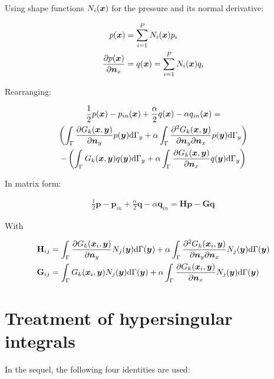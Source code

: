 \documentclass[a4paper, 10pt]{article}
\newcommand{\td}{\mathrm{d}}
\newcommand{\sx}{\bm{\mathnormal{x}}}
\newcommand{\sy}{\bm{\mathnormal{y}}}
\newcommand{\sn}{\bm{\mathnormal{n}}}
\newcommand{\bp}{\mathbf{p}}
\newcommand{\bq}{\mathbf{q}}
\newcommand{\bH}{\mathbf{H}}
\newcommand{\bG}{\mathbf{G}}
\begin{document}
Using shape functions $N_i(\sx)$ for the pressure and its normal derivative:

\begin{align}
	p(\sx) & = \sum\limits_{i=1}^P N_i(\sx)p_i \\
	\frac{\partial p(\sx)}{\partial \sn_x} & = q(\sx) = \sum\limits_{i=1}^P N_i(\sx)q_i
\end{align}

Rearranging:

\begin{multline}
	\frac{1}{2} p (\sx)
	-
	p_{in}(\sx)
	+
	\frac{\alpha}{2} q(\sx)
	-
	\alpha q_{in}(\sx)
	= \\
	\left(
	\int_{\Gamma} \frac{\partial{G}_k (\sx, \sy)}{\partial \sn_y} p(\sy) \td \Gamma_y
	+
	\alpha \int_{\Gamma}
	\frac{\partial^2{G}_k (\sx, \sy)}{\partial \sn_y \partial \sn_x} p(\sy) \td \Gamma_y
	\right)
	\\
	-
	\left(
	\int_{\Gamma} G_k(\sx,\sy) q(\sy) \td \Gamma_y
	+
	\alpha \int_{\Gamma}
	\frac{\partial G_k(\sx,\sy)}{\partial \sn_x}q(\sy) \td \Gamma_y
	\right)
\end{multline}

In matrix form:

\begin{align}
	\frac{1}{2} \mathbf{p} - \mathbf{p}_{in} + \frac{\alpha}{2} \mathbf{q} - \alpha \mathbf{q}_{in} = \bH \bp - \bG \bq
\end{align}

With

\begin{align}
	\bH_{ij}
	& = \int_{\Gamma}\frac{\partial{G}_k (\sx_i, \sy)}{\partial \sn_y} N_j(\sy) \td \Gamma(\sy)
	+ \alpha \int_\Gamma \frac{\partial^2{G}_k (\sx_i, \sy)}{\partial \sn_y \partial \sn_x} N_j(\sy) \td \Gamma(\sy) \nonumber \\
	\bG_{ij}
	& = \int_{\Gamma} G_k(\sx_i,\sy) N_j(\sy) \td \Gamma(\sy)
	+ \alpha \int_\Gamma \frac{\partial{G}_k (\sx_i, \sy)}{\partial \sn_x} N_j(\sy) \td \Gamma(\sy)
\end{align}




\section{Treatment of hypersingular integrals}

In the sequel, the following four identities are used:

\end{document}
